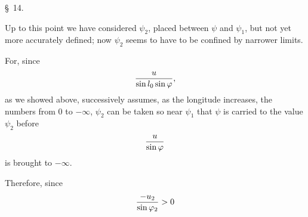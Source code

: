 \begin{center}\S\ 14.\end{center}

Up to this point we have considered $\psi_2$, placed between $\psi$ and $\psi_1$, but not yet more accurately defined; now $\psi_2$ seems to have to be confined by narrower limits.

For, since
\[
 {u\over \sin l_0\sin\varphi},
\]
as we showed above, successively assumes, as the longitude increases, the numbers from $0$ to $-\infty$, $\psi_2$ can be taken so near $\psi_1$ that $\psi$ is carried to the value $\psi_2$ before
\[
 {u\over \sin\varphi}
\]
is brought to $-\infty$.

Therefore, since
\[
 {-u_2\over \sin\varphi_2}>0
\]
